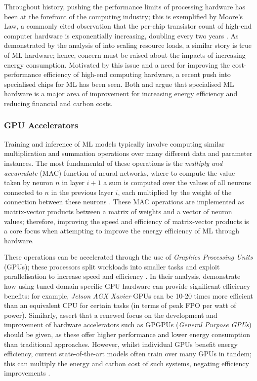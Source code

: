 \documentclass[a4paper, 12pt]{article}
\begin{document}
    Throughout history, pushing the performance limits of processing hardware has been at the forefront of the computing industry; this is exemplified by Moore's Law, a commonly cited observation that the per-chip transistor count of high-end computer hardware is exponentially increasing, doubling every two years \cite{amodei-hernandez-2021}. As demonstrated by the analysis of  into scaling resource loads, a similar story is true of ML hardware; hence, concern must be raised about the impacts of increasing energy consumption. Motivated by this issue and a need for improving the cost-performance efficiency of high-end computing hardware, a recent push into specialised chips for ML has been seen. Both  and  argue that specialised ML hardware is a major area of improvement for increasing energy efficiency and reducing financial and carbon costs.

    \subsubsection{GPU Accelerators}

    Training and inference of ML models typically involve computing similar multiplication and summation operations over many different data and parameter instances. The most fundamental of these operations is the \emph{multiply and accumulate} (MAC) function of neural networks, where to compute the value taken by neuron $n$ in layer $i+1$ a sum is computed over the values of all neurons connected to $n$ in the previous layer $i$, each multiplied by the weight of the connection between these neurons \cite{burr-2021}. These MAC operations are implemented as matrix-vector products between a matrix of weights and a vector of neuron values; therefore, improving the speed and efficiency of matrix-vector products is a core focus when attempting to improve the energy efficiency of ML through hardware. 

    These operations can be accelerated through the use of \emph{Graphics Processing Units} (GPUs); these processors split workloads into smaller tasks and exploit parallelisation to increase speed and efficiency \cite{kumar-2020}. In their analysis,  demonstrate how using tuned domain-specific GPU hardware can provide significant efficiency benefits: for example, \emph{Jetson AGX Xavier} GPUs \cite{seznec-2021} can be 10-20 times more efficient than an equivalent CPU for certain tasks (in terms of peak FPO per watt of power). Similarly,  assert that a renewed focus on the development and improvement of hardware accelerators such as GPGPUs (\emph{General Purpose GPUs}) should be given, as these offer higher performance and lower energy consumption than traditional approaches. However, whilst individual GPUs benefit energy efficiency, current state-of-the-art models often train over many GPUs in tandem; this can multiply the energy and carbon cost of such systems, negating efficiency improvements \cite{leeuw-2021}.
\end{document}

